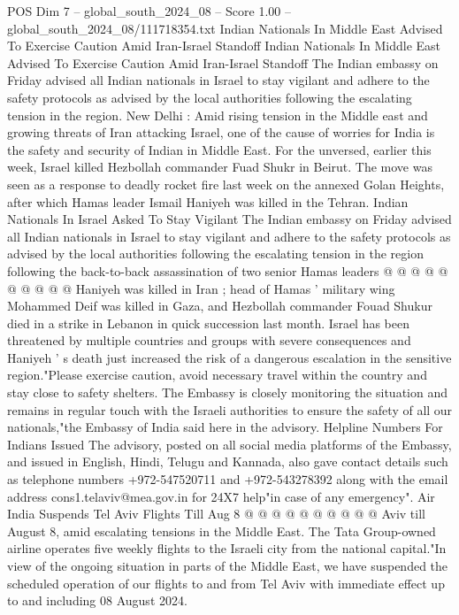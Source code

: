 \begin{textsample}{POS Dim 7 – global\_south\_2024\_08 – Score 1.00 – global\_south\_2024\_08/111718354.txt}  \label{ex:f7_pos_072}
Indian Nationals In Middle East Advised To Exercise Caution Amid Iran-Israel Standoff Indian Nationals In Middle East Advised To Exercise Caution Amid Iran-Israel Standoff The Indian embassy on Friday advised all Indian nationals in Israel to stay vigilant and adhere to the safety protocols as advised by the local authorities following the escalating tension in the region.
New Delhi : Amid rising tension in the Middle east and growing threats of Iran attacking Israel, one of the cause of worries for India is the safety and security of Indian in Middle East.
For the unversed, earlier this week, Israel killed Hezbollah commander Fuad Shukr in Beirut.
The move was seen as a response to deadly rocket fire last week on the annexed Golan Heights, after which Hamas leader Ismail Haniyeh was killed in the Tehran.
Indian Nationals In Israel Asked To Stay Vigilant The Indian embassy on Friday advised all Indian nationals in Israel to stay vigilant and adhere to the safety protocols as advised by the local authorities following the escalating tension in the region following the back-to-back assassination of two senior Hamas leaders @ @ @ @ @ @ @ @ @ @ Haniyeh was killed in Iran ; head of Hamas ' military wing Mohammed Deif was killed in Gaza, and Hezbollah commander Fouad Shukur died in a strike in Lebanon in quick succession last month.
Israel has been threatened by multiple countries and groups with severe consequences and Haniyeh ' s death just increased the risk of a dangerous escalation in the sensitive region."Please exercise caution, avoid necessary travel within the country and stay close to safety shelters.
The Embassy is closely monitoring the situation and remains in regular touch with the Israeli authorities to ensure the safety of all our nationals,"the Embassy of India said here in the advisory.
Helpline Numbers For Indians Issued The advisory, posted on all social media platforms of the Embassy, and issued in English, Hindi, Telugu and Kannada, also gave contact details such as telephone numbers +972-547520711 and +972-543278392 along with the email address cons1.telaviv@mea.gov.in for 24X7 help"in case of any emergency".
Air India Suspends Tel Aviv Flights Till Aug 8 @ @ @ @ @ @ @ @ @ @ Aviv till August 8, amid escalating tensions in the Middle East.
The Tata Group-owned airline operates five weekly flights to the Israeli city from the national capital."In view of the ongoing situation in parts of the Middle East, we have suspended the scheduled operation of our flights to and from Tel Aviv with immediate effect up to and including 08 August 2024.

\end{textsample}
